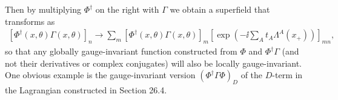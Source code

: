 Then by multiplying \(\Phi^\dagger\) on the right with \(\Gamma\) we
obtain a superfield that transforms as
\begin{equation}
  \begin{split}
  \left[\Phi^\dagger(x,\theta)\Gamma(x,\theta)\right]_n
  \longrightarrow
  \sum_m\left[\Phi^\dagger(x,\theta)\Gamma(x,\theta)\right]_m
  \left[
    \exp\left(-\ii\sum_A t_A\Lambda^A(x_+)\right)
  \right]_{mn},
  \end{split}
  \tag{27.1.5}\label{eq:27.1.5}
\end{equation}
so that any globally gauge-invariant function constructed from \(\Phi\)
and \(\Phi^\dagger\Gamma\) (and not their derivatives or complex
conjugates) will also be locally gauge-invariant. One obvious example is
the gauge-invariant version \((\Phi^\dagger\Gamma\Phi)_D\) of the
\(D\)-term in the Lagrangian constructed in Section 26.4.

